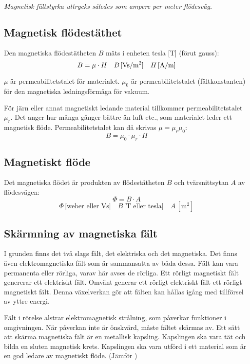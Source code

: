 \emph{Magnetisk fältstyrka uttrycks således som ampere per meter flödesväg.}

\subsection{Magnetisk flödestäthet}

Den magnetiska flödestätheten \(B\) mäts i enheten tesla \(\text{[T]}\) (förut gauss):
\[B = \mu \cdot H \quad B\, \text{[Vs/m$ ^2 $]}\quad H\, \text{[A/m]}\]

\(\mu\) är permeabilitetstalet för materialet.
\(\mu_0\) är permeabilitetstalet (fältkonstanten) för den magnetiska
ledningsförmåga för vakuum.

För järn eller annat magnetiskt ledande material tillkommer permeabilitetstalet
\(\mu_r\).
Det anger hur många gånger bättre än luft etc., som materialet leder ett
magnetisk flöde.
Permeabilitetstalet kan då skrivas
\(\mu = \mu_r\mu_0\):
\[B = \mu_0 \cdot \mu_r \cdot H\]


\subsection{Magnetiskt flöde}

Det magnetiska flödet är produkten av flödestätheten \(B\) och tvärsnittsytan
\(A\) av flödesvägen:
\[\Phi = B \cdot A\]
\[\Phi\, \text{[weber eller Vs]}\quad B\, \text{[T eller tesla]} \quad A\, [\text{m}^2]\]

\subsection{Skärmning av magnetiska fält}
\label{elektromagnetisk skärmning}

I grunden finns det två slags fält, det elektriska och det magnetiska. Det
finns även elektromagnetiska fält som är sammansatta av båda dessa.
Fält kan vara permanenta eller rörliga, varav här avses de rörliga.
Ett rörligt magnetiskt fält genererar ett elektriskt fält.
Omvänt generar ett rörligt elektriskt fält ett rörligt magnetiskt fält.
Denna växelverkan gör att fälten kan hållas igång med tillförsel av yttre
energi.

Fält i rörelse alstrar elektromagnetisk strålning, som påverkar funktioner i
omgivningen.
När påverkan inte är önskvärd, måste fältet skärmas av.
Ett sätt att skärma magnetiska fält är en metallisk kapsling.
Kapslingen ska vara tät och bilda en sluten magnetisk krets.
Kapslingen ska vara utförd i ett material som är en god ledare av magnetiskt
flöde.
(Jämför )
